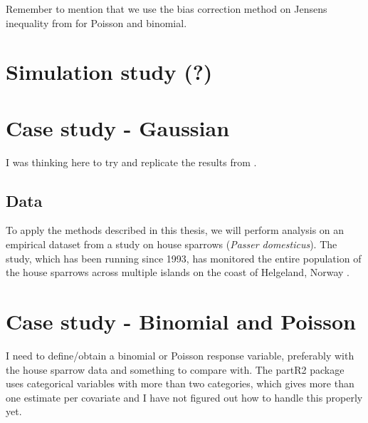 Remember to mention that we use the bias correction method on Jensens inequality from \citep{nakagawa2017} for Poisson and binomial.

\section{Simulation study (?)}

\section{Case study - Gaussian}
I was thinking here to try and replicate the results from \citet{Stensland_GMRF_bayes_animal_model}.
\subsection{Data}
To apply the methods described in this thesis, we will perform analysis on an empirical dataset from a study on house sparrows (\textit{Passer domesticus}). 
The study, which has been running since 1993, has monitored the entire population of the house sparrows across multiple islands on the coast of Helgeland, Norway \citep{Muff2019Genetic}.


\section{Case study - Binomial and Poisson}
I need to define/obtain a binomial or Poisson response variable, preferably with the house sparrow data and something to compare with.
The partR2 package uses categorical variables with more than two categories, which gives more than one estimate per covariate and I have not figured out how to handle this properly yet.



